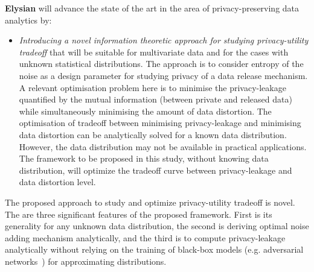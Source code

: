 \documentclass[a4paper,11pt]{article}
\newcommand{\project}[1]{\textbf{#1}\xspace}
\newcommand{\SECURITY}{\project{Elysian}}
\newcommand{\TheProject}{\SECURITY}
\begin{document}
\begin{mdframed}[backgroundcolor=gray!10]
\TheProject{} will advance the state of the art in the area of privacy-preserving data analytics by:
\begin{itemize}
\item \emph{Introducing a novel information theoretic approach for studying privacy-utility tradeoff} that will be suitable for multivariate data and for the cases with unknown statistical distributions. The approach is to consider entropy of the noise as a design parameter for studying privacy of a data release mechanism. A relevant optimisation problem here is to minimise the privacy-leakage quantified by the mutual information (between private and released data) while simultaneously minimising the amount of data distortion. The optimisation of tradeoff between minimising privacy-leakage and minimising data distortion can be analytically solved for a known data distribution. However, the data distribution may not be available in practical applications. The framework to be proposed in this study, without knowing data distribution, will optimize the tradeoff curve between privacy-leakage and data distortion level. 
\end{itemize}

\end{mdframed}
  

The proposed approach to study and optimize privacy-utility tradeoff is novel. The are three significant features of the proposed framework. First is its generality for any unknown data distribution, the second is deriving optimal noise adding mechanism analytically, and the third is to compute privacy-leakage analytically without relying on the training of black-box models (e.g. adversarial networks~\cite{8919758}) for approximating distributions. 
\end{document}
